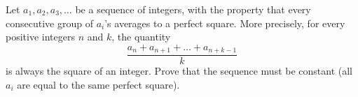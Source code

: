 Let $a_1,a_2,a_3,\ldots$ be a sequence of integers, with the property that every consecutive group of $a_i$'s averages to a perfect square. More precisely, for every positive integers $n$ and $k$, the quantity \[\frac{a_n+a_{n+1}+\ldots+a_{n+k-1}}{k}\] is always the square of an integer. Prove that the sequence must be constant (all $a_i$ are equal to the same perfect square).